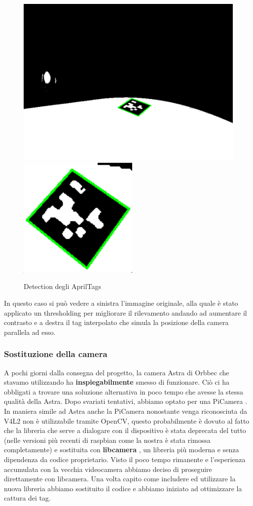\documentclass[]{article}
\begin{document}
\begin{figure}[H]
    \centering
    \includegraphics[height=0.3\linewidth]{immagini/stretching_tag_immagine_binarizzata.png}
    \hspace*{15pt}
    \includegraphics[height=0.3\linewidth]{immagini/tag_stretchato.png}
    \caption{Detection degli AprilTags}
\end{figure}

In questo caso si può vedere a sinistra l'immagine originale, alla quale è stato applicato un thresholding per migliorare il rilevamento andando ad aumentare il contrasto e a destra il tag interpolato che simula la posizione della camera parallela ad esso.

\subsubsection{Sostituzione della camera}
A pochi giorni dalla consegna del progetto, la camera Astra di Orbbec che stavamo utilizzando ha \textbf{inspiegabilmente} smesso di funzionare. Ciò ci ha obbligati a trovare una soluzione alternativa in poco tempo che avesse la stessa qualità della Astra. Dopo svariati tentativi, abbiamo optato per una PiCamera \cite{picam}.
In maniera simile ad Astra anche la PiCamera nonostante venga riconosciuta da V4L2 non è utilizzabile tramite OpenCV, questo probabilmente è dovuto al fatto che la libreria
che serve a dialogare con il dispositivo è stata deprecata del tutto \cite{newdriver} (nelle versioni più recenti di raspbian come la nostra è stata rimossa completamente) e sostituita con \textbf{libcamera} \cite{libcamera},
un libreria più moderna e senza dipendenza da codice proprietario. Visto il poco tempo rimanente e l'esperienza accumulata con la vecchia videocamera abbiamo deciso di proseguire direttamente con libcamera.
Una volta capito come includere ed utilizzare la nuova libreria abbiamo sostituito il codice e abbiamo iniziato ad ottimizzare la cattura dei tag.
\end{document}
